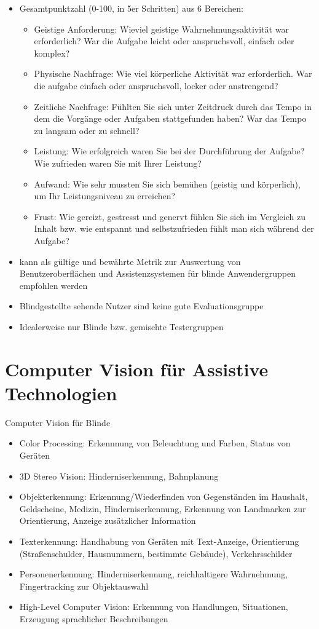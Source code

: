 \documentclass[paper=a4, fontsize=11pt]{scrartcl} %
\numberwithin{equation}{section} %
\numberwithin{figure}{section} %
\numberwithin{table}{section} %
\begin{document}
\begin{itemize}
\item Gesamtpunktzahl (0-100, in 5er Schritten) aus 6 Bereichen:
\begin{itemize}
\item Geistige Anforderung: Wieviel geistige Wahrnehmungsaktivität war erforderlich? War die Aufgabe leicht oder anspruchsvoll, einfach oder komplex?
\item Physische Nachfrage: Wie viel körperliche Aktivität war erforderlich. War die aufgabe einfach oder anspruchsvoll, locker oder anstrengend?
\item Zeitliche Nachfrage: Fühlten Sie sich unter Zeitdruck durch das Tempo in dem die Vorgänge oder Aufgaben stattgefunden haben? War das Tempo zu langsam oder zu schnell?
\item Leistung: Wie erfolgreich waren Sie bei der Durchführung der Aufgabe? Wie zufrieden waren Sie mit Ihrer Leistung?
\item Aufwand: Wie sehr mussten Sie sich bemühen (geistig und körperlich), um Ihr Leistungsniveau zu erreichen?
\item Frust: Wie gereizt, gestresst und genervt fühlen Sie sich im Vergleich zu Inhalt bzw. wie entspannt und selbstzufrieden fühlt man sich während der Aufgabe?
\end{itemize}
\item kann als gültige und bewährte Metrik zur Auswertung von Benutzeroberflächen und Assistenzsystemen für blinde Anwendergruppen empfohlen werden
\item Blindgestellte sehende Nutzer sind keine gute Evaluationsgruppe
\item Idealerweise nur Blinde bzw. gemischte Testergruppen
\end{itemize}

\section{Computer Vision für Assistive Technologien}

Computer Vision für Blinde
\begin{itemize}
\item Color Processing: Erkennnung von Beleuchtung und Farben, Status von Geräten
\item 3D Stereo Vision: Hinderniserkennung, Bahnplanung
\item Objekterkennung: Erkennung/Wiederfinden von Gegenständen im Haushalt, Geldscheine, Medizin, Hinderniserkennung, Erkennung von Landmarken zur Orientierung, Anzeige zusätzlicher Information
\item Texterkennung: Handhabung von Geräten mit Text-Anzeige, Orientierung (Straßenschulder, Hausnummern, bestimmte Gebäude), Verkehrsschilder
\item Personenerkennung: Hinderniserkennung, reichhaltigere Wahrnehmung, Fingertracking zur Objektauswahl
\item High-Level Computer Vision: Erkennung von Handlungen, Situationen, Erzeugung sprachlicher Beschreibungen
\end{itemize}
\end{document}
